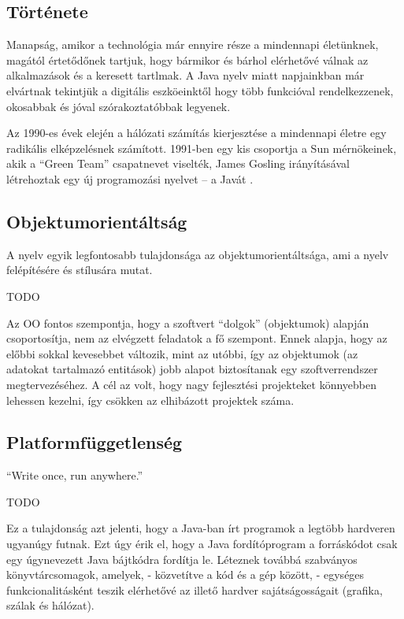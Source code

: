\documentclass[a4paper,12pt]{report}
\begin{document}
\subsection{Története}
\label{javahistory}

Manapság, amikor a technológia már ennyire része a mindennapi életünknek, magától értetődőnek tartjuk, hogy bármikor és bárhol elérhetővé válnak az alkalmazások és a keresett tartlmak. A Java nyelv miatt napjainkban már elvártnak tekintjük a digitális eszköeinktől hogy több funkcióval rendelkezzenek, okosabbak és jóval szórakoztatóbbak legyenek.

\vspace{2mm}
Az 1990-es évek elején a hálózati számítás kierjesztése a mindennapi életre egy radikális elképzelésnek számított. 1991-ben egy kis csoportja a Sun mérnökeinek, akik a ``Green Team'' csapatnevet viselték, James Gosling irányításával létrehoztak egy új programozási nyelvet -- a Javát \cite{javahistory}.

\subsection{Objektumorientáltság}
\label{oo}

A nyelv egyik legfontosabb tulajdonsága az objektumorientáltsága, ami a nyelv felépítésére és stílusára mutat. 

TODO

Az OO fontos szempontja, hogy a szoftvert ``dolgok'' (objektumok) alapján csoportosítja, nem az elvégzett feladatok a fő szempont. Ennek alapja, hogy az előbbi sokkal kevesebbet változik, mint az utóbbi, így az objektumok (az adatokat tartalmazó entitások) jobb alapot biztosítanak egy szoftverrendszer megtervezéséhez. A cél az volt, hogy nagy fejlesztési projekteket könnyebben lehessen kezelni, így csökken az elhibázott projektek száma.

\subsection{Platformfüggetlenség}
\label{platformfugg}

``Write once, run anywhere.''


TODO

\vspace{2mm}
Ez a tulajdonság azt jelenti, hogy a Java-ban írt programok a legtöbb hardveren ugyanúgy futnak. Ezt úgy érik el, hogy a Java fordítóprogram a forráskódot csak egy úgynevezett Java bájtkódra fordítja le. Léteznek továbbá szabványos könyvtárcsomagok, amelyek, - közvetítve a kód és a gép között, - egységes funkcionalitásként teszik elérhetővé az illető hardver sajátságosságait (grafika, szálak és hálózat).
\end{document}
